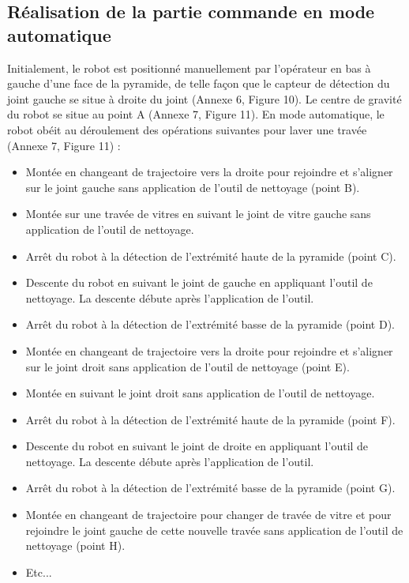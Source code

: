 \subsection{Réalisation de la partie commande en mode automatique}

Initialement, le robot est positionné manuellement par l'opérateur en bas à gauche d'une face de la pyramide, de telle façon que le capteur de détection du joint gauche se situe à droite du joint (Annexe 6, Figure 10). Le centre de gravité du robot se situe au point A (Annexe 7, Figure 11). En mode automatique, le robot obéit au déroulement des opérations suivantes pour laver une travée (Annexe 7, Figure 11) :
\begin{itemize}
 \item Montée en changeant de trajectoire vers la droite pour rejoindre et s'aligner sur le joint gauche sans application de l'outil de nettoyage (point B).
 \item Montée sur une travée de vitres en suivant le joint de vitre gauche sans application de l'outil de nettoyage.
 \item Arrêt du robot à la détection de l'extrémité haute de la pyramide (point C).
 \item Descente du robot en suivant le joint de gauche en appliquant l'outil de nettoyage. La descente débute après l'application de l'outil.
 \item Arrêt du robot à la détection de l'extrémité basse de la pyramide (point D).
 \item Montée en changeant de trajectoire vers la droite pour rejoindre et s'aligner sur le joint droit sans application de l'outil de nettoyage (point E).
 \item Montée en suivant le joint droit sans application de l'outil de nettoyage.
 \item Arrêt du robot à la détection de l'extrémité haute de la pyramide (point F).
 \item Descente du robot en suivant le joint de droite en appliquant l'outil de nettoyage. La descente débute après l'application de l'outil.
 \item Arrêt du robot à la détection de l'extrémité basse de la pyramide (point G).
 \item Montée en changeant de trajectoire pour changer de travée de vitre et pour rejoindre le joint gauche de cette nouvelle travée sans application de l'outil de nettoyage (point H).
 \item Etc...
\end{itemize}

